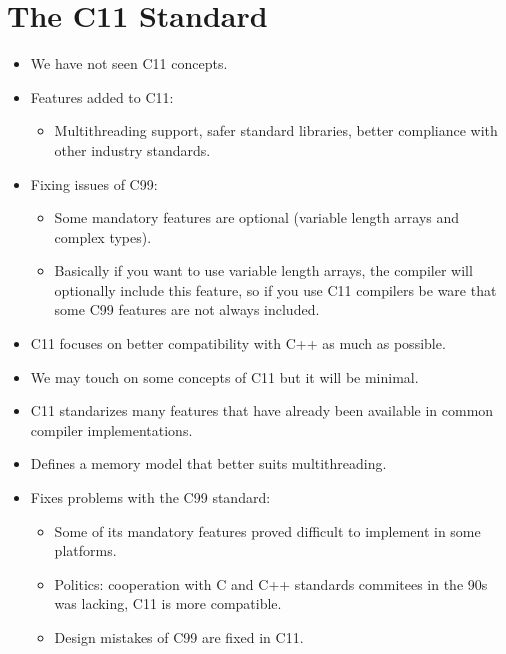 \section{The C11 Standard}
\begin{itemize}
    \item We have not seen C11 concepts.
    \item Features added to C11:
        \begin{itemize}
            \item Multithreading support, safer standard libraries, better compliance with other industry standards.
        \end{itemize}
    
    \item Fixing issues of C99:
        \begin{itemize}
            \item Some mandatory features are optional (variable length arrays and complex types).
            \item Basically if you want to use variable length arrays, the compiler will optionally include this feature, so if you use C11 compilers be ware that some C99 features are not always included.
        \end{itemize}
    
    \item C11 focuses on better compatibility with C++ as much as possible.
    \item We may touch on some concepts of C11 but it will be minimal.
    \item C11 standarizes many features that have already been available in common compiler implementations.
    \item Defines a memory model that better suits multithreading.
    \item Fixes problems with the C99 standard:
        \begin{itemize}
            \item Some of its mandatory features proved difficult to implement in some platforms.
            \item Politics: cooperation with C and C++ standards commitees in the 90s was lacking, C11 is more compatible.
            \item Design mistakes of C99 are fixed in C11.
        \end{itemize}
    

\end{itemize}
